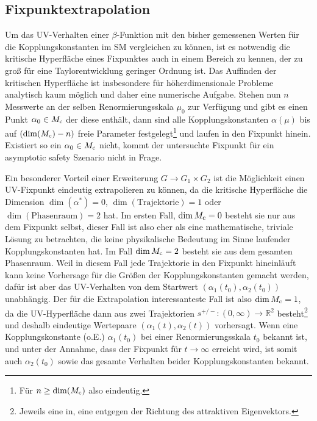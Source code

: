     
  \subsection{Fixpunktextrapolation}
    Um das UV-Verhalten einer $\beta$-Funktion mit den bisher gemessenen Werten 
    für die Kopplungskonstanten im SM vergleichen zu können, ist es notwendig 
    die kritische Hyperfläche eines Fixpunktes auch in einem Bereich zu kennen, 
    der zu groß für eine Taylorentwicklung geringer Ordnung ist. Das Auffinden 
    der kritischen Hyperfläche ist insbesondere für höherdimensionale Probleme 
    analytisch kaum möglich und daher eine numerische Aufgabe. Stehen nun 
    $n$ Messwerte an der selben Renormierungsskala 
    $\mu_0$ zur Verfügung und gibt es einen Punkt $\alpha_0\in M_\text{c}$ der diese 
    enthält, dann sind alle Kopplungskonstanten $\alpha(\mu)$ bis auf 
    $(\dim (M_\text{c})-n)$ freie Parameter festgelegt\footnote{Für $n\geq \dim(M_\text{c})$ 
    also eindeutig.} und laufen in den Fixpunkt hinein. Existiert so ein 
    $\alpha_0\in M_\text{c}$ nicht, kommt der untersuchte Fixpunkt für ein asymptotic 
    safety Szenario nicht in Frage. 

  
    Ein besonderer Vorteil einer Erweiterung $G \to G_1\times G_2$ ist die 
    Möglichkeit einen UV-Fixpunkt eindeutig extrapolieren zu können, da die 
    kritische Hyperfläche die Dimension $\dim(\alpha^*)=0$, 
    $\dim(\text{Trajektorie})=1$ oder $\dim(\text{Phasenraum})=2$ hat. Im 
    ersten Fall, $\dim M_\text{c}=0$ besteht sie nur aus dem Fixpunkt selbst, 
    dieser Fall ist also eher als eine mathematische, triviale Lösung zu 
    betrachten, die keine physikalische Bedeutung im Sinne laufender 
    Kopplungskonstanten hat. Im Fall $\dim M_\text{c} =2$ besteht sie aus dem gesamten 
    Phasenraum. Weil in diesem Fall jede Trajektorie in den Fixpunkt 
    hineinläuft kann keine Vorhersage für die Größen der Kopplungskonstanten 
    gemacht werden, dafür ist aber das UV-Verhalten von dem Startwert 
    $\left(\alpha_1(t_0),\alpha_2(t_0)\right)$ unabhängig. Der für die 
    Extrapolation interessanteste Fall ist also $\dim M_\text{c} = 1$, da die 
    UV-Hyperfläche dann aus zwei Trajektorien 
    $s^{+/-}:(0,\infty)\to \mathbb{R}^2$ besteht\footnote{Jeweils eine in, eine 
    entgegen der Richtung des attraktiven Eigenvektors.} und deshalb 
    eindeutige Wertepaare $(\alpha_1(t),\alpha_2(t))$ vorhersagt. Wenn eine 
    Kopplungskonstante (o.E.) $\alpha_1(t_0)$ bei einer Renormierungsskala 
    $t_0$ bekannt ist, und unter der Annahme, dass der Fixpunkt für 
    $t\to\infty$ erreicht wird, ist somit auch $\alpha_2(t_0)$ sowie das 
    gesamte Verhalten beider Kopplungskonstanten bekannt.
    
